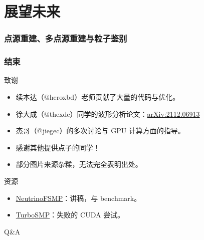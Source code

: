 \documentclass[aspectratio=169]{beamer}
\begin{document}
\section{展望未来}
\begin{frame}
    \frametitle{点源重建、多点源重建与粒子鉴别}



\end{frame}

\begin{frame}
    \frametitle{结束}

    \begin{block}{致谢}
        \begin{itemize}
            \item 续本达（@heroxbd）老师贡献了大量的代码与优化。
            \item 徐大成（@thexdc）同学的波形分析论文：\href{https://arxiv.org/abs/2112.06913}{arXiv:2112.06913}
            \item 杰哥（@jiegec）的多次讨论与 GPU 计算方面的指导。
            \item 感谢其他提供点子的同学！
            \item 部分图片来源杂糅，无法完全表明出处。
        \end{itemize}
    \end{block}

    \begin{block}{资源}
        \begin{itemize}
            \item \href{https://github.com/Berrysoft/NeutrinoFSMP}{NeutrinoFSMP}：讲稿，与 benchmark。
            \item \href{https://github.com/Berrysoft/TurboSMP}{TurboSMP}：失败的 CUDA 尝试。
        \end{itemize}
    \end{block}

\end{frame}

\begin{frame}[noframenumbering]

    \begin{minipage}{1\textwidth}
        \centering Q\&A
    \end{minipage}

\end{frame}
\end{document}
